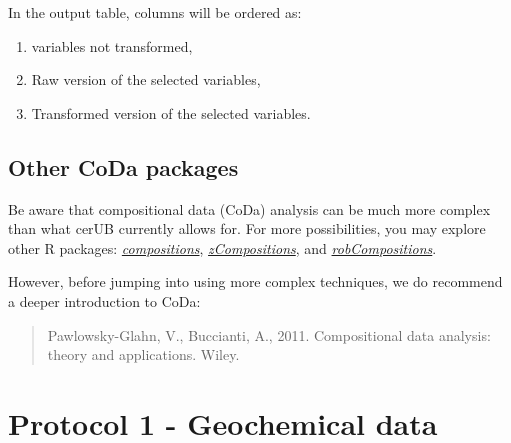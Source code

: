 \documentclass[12pt,]{book}
\newenvironment{Shaded}{\begin{snugshade}}{\end{snugshade}}
\newcommand{\DataTypeTok}[1]{\textcolor[rgb]{0.13,0.29,0.53}{#1}}
\newcommand{\KeywordTok}[1]{\textcolor[rgb]{0.13,0.29,0.53}{\textbf{#1}}}
\newcommand{\NormalTok}[1]{#1}
\newcommand{\OperatorTok}[1]{\textcolor[rgb]{0.81,0.36,0.00}{\textbf{#1}}}
\newcommand{\StringTok}[1]{\textcolor[rgb]{0.31,0.60,0.02}{#1}}
\providecommand{\tightlist}{%
  \setlength{\itemsep}{0pt}\setlength{\parskip}{0pt}}
\begin{document}
\begin{Shaded}
\end{Shaded}

In the output table, columns will be ordered as:

\begin{enumerate}
\def\labelenumi{\arabic{enumi}.}
\tightlist
\item
  variables not transformed,
\item
  Raw version of the selected variables,
\item
  Transformed version of the selected variables.
\end{enumerate}

\hypertarget{other-coda-packages}{%
\section{Other CoDa packages}\label{other-coda-packages}}

Be aware that compositional data (CoDa) analysis can be much more complex than what cerUB currently allows for. For more possibilities, you may explore other R packages: \href{https://cran.r-project.org/web/packages/compositions/index.html}{\emph{compositions}}, \href{https://cran.r-project.org/web/packages/zCompositions/index.html}{\emph{zCompositions}}, and \href{https://cran.r-project.org/web/packages/robCompositions/index.html}{\emph{robCompositions}}.

However, before jumping into using more complex techniques, we do recommend a deeper introduction
to CoDa:

\begin{quote}
Pawlowsky-Glahn, V., Buccianti, A., 2011. Compositional data analysis: theory and applications. Wiley.
\end{quote}

\hypertarget{prot1}{%
\chapter{Protocol 1 - Geochemical data}\label{prot1}}
\end{document}
